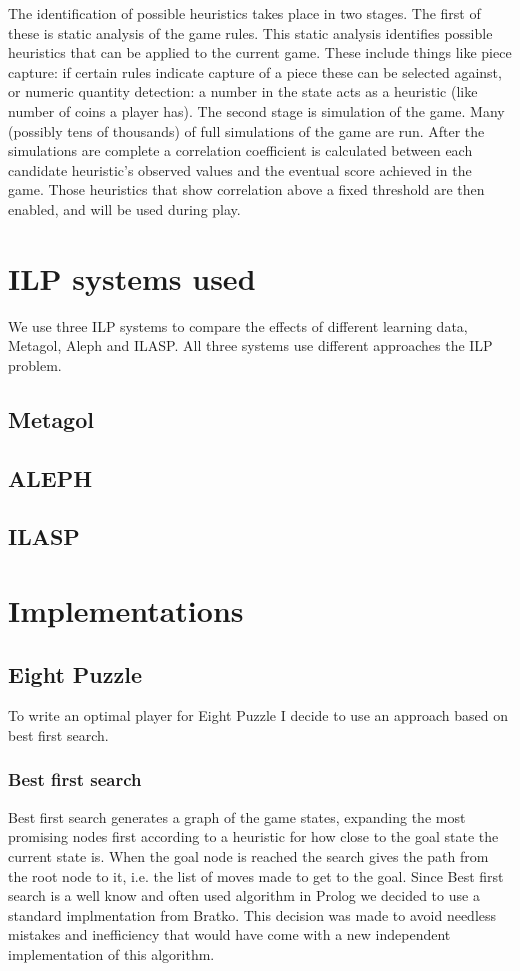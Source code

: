 \documentclass[a4paper,12pt]{report}
\begin{document}
The identification of possible heuristics takes place in two stages. The first of these is static analysis of the game rules. This static analysis identifies possible heuristics that can be applied to the current game. These include things like piece capture: if certain rules indicate capture of a piece these can be selected against, or numeric quantity detection: a number in the state acts as a heuristic (like number of coins a player has). The second stage is simulation of the game. Many (possibly tens of thousands) of full simulations of the game are run. After the simulations are complete a correlation coefficient is calculated between each candidate heuristic's observed values and the eventual score achieved in the game. Those heuristics that show correlation above a fixed threshold are then enabled, and will be used during play.

\chapter{ILP systems used}
We use three ILP systems to compare the effects of different learning data, Metagol, Aleph and ILASP. All three systems use different approaches the ILP problem.
\section{Metagol}
\section{ALEPH}
\section{ILASP}
\chapter{Implementations}
\section{Eight Puzzle}
To write an optimal player for Eight Puzzle I decide to use an approach based on best first search.
\subsection{Best first search}
Best first search generates a graph of the game states, expanding the most promising nodes first according to a heuristic for how close to the goal state the current state is. When the goal node is reached the search gives the path from the root node to it, i.e. the list of moves made to get to the goal.
Since Best first search is a well know and often used algorithm in Prolog we decided to use a standard implmentation from Bratko\cite{Bratko}. This decision was made to avoid needless mistakes and inefficiency that would have come with a new independent implementation of this algorithm.
\end{document}

